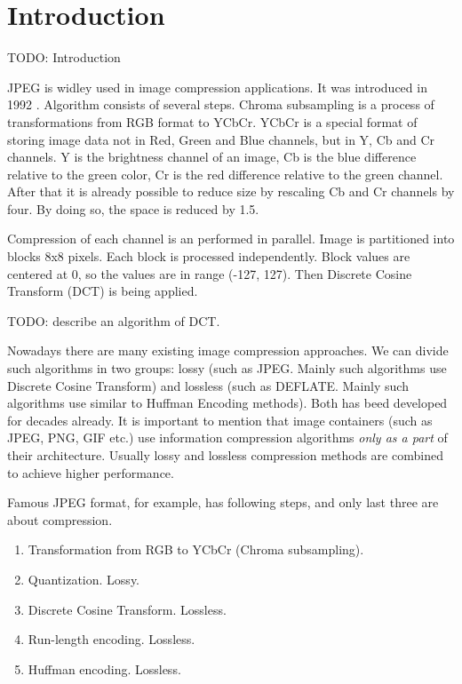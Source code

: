 \chapter{Introduction}

TODO: Introduction

JPEG is widley used in image compression applications. It was introduced in 1992 \cite{wallace_jpeg_1992}. Algorithm consists of several steps. Chroma subsampling is a process of transformations from RGB format to YCbCr. YCbCr is a special format of storing image data not in Red, Green and Blue channels, but in Y, Cb and Cr channels. Y is the brightness channel of an image, Cb is the blue difference relative to the green color, Cr is the red difference relative to the green channel. After that it is already possible to reduce size by rescaling Cb and Cr channels by four. By doing so, the space is reduced by 1.5.

Compression of each channel is an performed in parallel. Image is partitioned into blocks 8x8 pixels. Each block is processed independently. Block values are centered at 0, so the values are in range (-127, 127). Then Discrete Cosine Transform (DCT) is being applied.

TODO: describe an algorithm of DCT.



Nowadays there are many existing image compression approaches. We can divide such algorithms in two groups: lossy (such as JPEG. Mainly such algorithms use Discrete Cosine Transform) and lossless (such as DEFLATE. Mainly such algorithms use similar to Huffman Encoding methods). Both has beed developed for decades already. It is important to mention that image containers (such as JPEG, PNG, GIF etc.) use information compression algorithms \textit{only as a part} of their architecture. Usually lossy and lossless compression methods are combined to achieve higher performance.

Famous JPEG format, for example, has following steps, and only last three are about compression.

\begin{enumerate}
    \item Transformation from RGB to YCbCr (Chroma subsampling).
    \item Quantization. Lossy.
    \item Discrete Cosine Transform. Lossless.
    \item Run-length encoding. Lossless.
    \item Huffman encoding. Lossless.
\end{enumerate}

